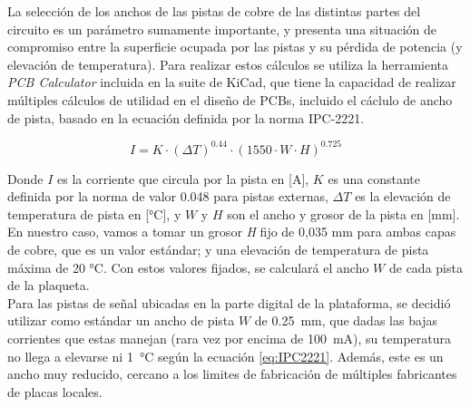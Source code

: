 La selección de los anchos de las pistas de cobre de las distintas partes del circuito es un parámetro sumamente importante, y presenta una situación de compromiso entre la superficie ocupada por las pistas y su pérdida de potencia (y elevación de temperatura). Para realizar estos cálculos se utiliza la herramienta \textit{PCB Calculator} incluida en la suite de KiCad, que tiene la capacidad de realizar múltiples cálculos de utilidad en el diseño de PCBs, incluido el cáclulo de ancho de pista, basado en la ecuación definida por la norma IPC-2221.

\begin{equation}\label{eq:IPC2221}
    I = K\cdot (\Delta T)^{\num{0.44}}\cdot (\num{1550}\cdot W\cdot H)^{\num{0.725}}
\end{equation}

Donde $I$ es la corriente que circula por la pista en [\unit{\ampere}], $K$ es una constante definida por la norma de valor \num{0.048} para pistas externas, $\Delta T$ es la elevación de temperatura de pista en [\unit{\celsius}], y $W$ y $H$ son el ancho y grosor de la pista en [\unit{\milli\metre}].\\

En nuestro caso, vamos a tomar un {\Medium grosor \textit{H} fijo de 0,035 mm} para ambas capas de cobre, que es un valor estándar; y una {\Medium elevación de temperatura de pista máxima de 20 °C}. Con estos valores fijados, se calculará el ancho $W$ de cada pista de la plaqueta.\\

Para las pistas de señal ubicadas en la parte digital de la plataforma, se decidió utilizar como estándar un ancho de pista $W$ de \SI[]{0.25}[]{\milli\metre}, que dadas las bajas corrientes que estas manejan (rara vez por encima de \SI[]{100}[]{\milli\ampere}), su temperatura no llega a elevarse ni \SI[]{1}[]{\celsius} según la ecuación \ref{eq:IPC2221}. Además, este es un ancho muy reducido, cercano a los limites de fabricación de múltiples fabricantes de placas locales.\\